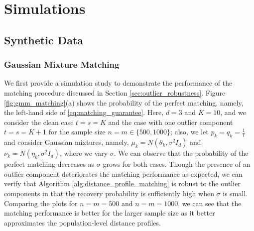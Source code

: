 \documentclass[11pt,letterpaper]{article}
\theoremstyle{definition}
\numberwithin{equation}{section}
\begin{document}
\section{Simulations}
\label{sec:simulations}


\subsection{Synthetic Data}


\subsubsection{Gaussian Mixture Matching}
We first provide a simulation study to demonstrate the performance of the matching procedure discussed in Section \ref{sec:outlier_robustness}. Figure \ref{fig:gmm_matching}(a) shows the probability of the perfect matching, namely, the left-hand side of \eqref{eq:matching_guarantee}. Here, $d = 3$ and $K = 10$, and we consider the clean case $t = s = K$ and the case with one outlier component $t = s = K + 1$ for the sample size $n = m \in \{500, 1000\}$; also, we let $p_k = q_k = \frac{1}{t}$ and consider Gaussian mixtures, namely, $\mu_k = N(\theta_k, \sigma^2 I_d)$ and $\nu_k = N(\eta_k, \sigma^2 I_d)$, where we vary $\sigma$. We can observe that the probability of the perfect matching decreases as $\sigma$ grows for both cases. Though the presence of an outlier component deteriorates the matching performance as expected, we can verify that Algorithm \ref{alg:distance_profile_matching} is robust to the outlier components in that the recovery probability is sufficiently high when $\sigma$ is small. Comparing the plots for $n = m = 500$ and $n = m = 1000$, we can see that the matching performance is better for the larger sample size as it better approximates the population-level distance profiles.
\end{document}
